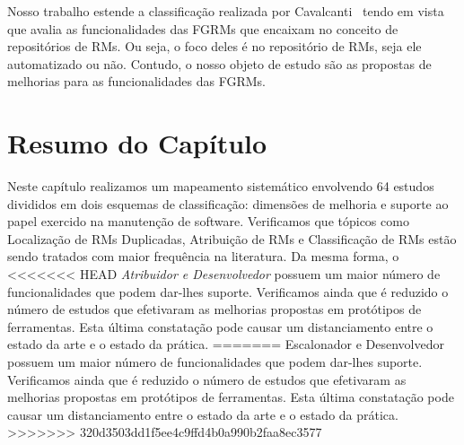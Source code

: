 Nosso trabalho estende a classificação realizada por
Cavalcanti~\cite{cavalcanti2014challenges} tendo em vista que avalia as
funcionalidades das FGRMs que encaixam no conceito de repositórios de RMs. Ou
seja, o foco deles é no repositório de RMs, seja ele automatizado ou não.
Contudo, o nosso objeto de estudo são as propostas de melhorias para as
funcionalidades das FGRMs.

\section{Resumo do Capítulo}
\label{sec:resumo_capitulo}

Neste capítulo realizamos um mapeamento sistemático envolvendo 64 estudos
divididos em dois esquemas de classificação: dimensões de melhoria e suporte ao
papel exercido na manutenção de software. Verificamos que tópicos como
Localização de RMs Duplicadas, Atribuição de RMs e Classificação de
RMs estão sendo tratados com maior frequência na literatura. Da mesma forma, o
<<<<<<< HEAD
\textit{Atribuidor e Desenvolvedor} possuem um maior número de funcionalidades
que podem dar-lhes suporte. Verificamos ainda que é reduzido o número de
estudos que efetivaram as melhorias propostas em protótipos de ferramentas.
Esta última constatação pode causar um distanciamento entre o estado da arte e
o estado da prática.
=======
Escalonador e Desenvolvedor possuem um maior número de funcionalidades que
podem dar-lhes suporte. Verificamos ainda que é reduzido o número de estudos
que efetivaram as melhorias propostas em protótipos de ferramentas.  Esta
última constatação pode causar um distanciamento entre o estado da arte e o
estado da prática.
>>>>>>> 320d3503dd1f5ee4c9ffd4b0a990b2faa8ec3577
